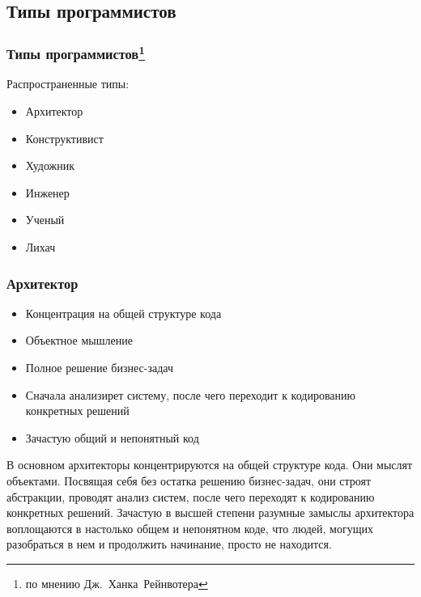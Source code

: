 \documentclass{../industrial-development}
\begin{document}
{\subsection{Типы программистов}
\begin{frame} \frametitle{Типы программистов\footnote[1]{по мнению Дж.~Ханка~Рейнвотера}}
	\begin{block}{Распространенные типы:}
\begin{itemize}
\item Архитектор
\item Конструктивист 
\item Художник
\item Инженер
\item Ученый
\item Лихач
\end{itemize}
\end{block}
\end{frame}
\lecturenotes

\begin{frame} \frametitle{Архитектор}
	 \begin{itemize}
                     \item Концентрация на общей структуре кода
 		\item Объектное мышление
		\item Полное решение бизнес-задач
 		\item Сначала анализирет систему, после чего переходит к кодированию конкретных решений
		\item Зачастую общий и непонятный код
		\end{itemize} 
\end{frame}
\lecturenotes
В основном архитекторы концентрируются на общей структуре кода. Они мыслят объектами. Посвящая себя без остатка решению бизнес-задач, они строят абстракции, проводят анализ систем, после чего переходят к кодированию конкретных решений.
Зачастую в высшей степени разумные замыслы архитектора воплощаются в настолько общем и непонятном коде, что людей, могущих разобраться в нем и продолжить начинание, просто не находится.

}
\end{document}

